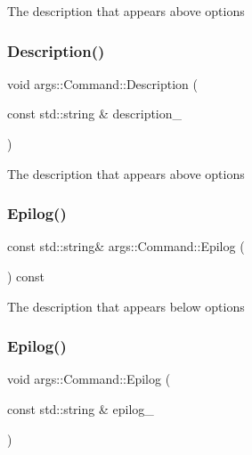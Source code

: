 The description that appears above options \mbox{\label{classargs_1_1_command_a4ee8820d1d6d17b10a01a5cbccce1df8}} 
\subsubsection{\texorpdfstring{Description()}{Description()}\hspace{0.1cm}{\footnotesize\ttfamily [2/2]}}
{\footnotesize\ttfamily void args\+::\+Command\+::\+Description (\begin{DoxyParamCaption}\item[{const std\+::string \&}]{description\+\_\+ }\end{DoxyParamCaption})\hspace{0.3cm}{\ttfamily [inline]}}

The description that appears above options \mbox{\label{classargs_1_1_command_a874b615da38bb03c42a5fdf281ca9e32}} 
\subsubsection{\texorpdfstring{Epilog()}{Epilog()}\hspace{0.1cm}{\footnotesize\ttfamily [1/2]}}
{\footnotesize\ttfamily const std\+::string\& args\+::\+Command\+::\+Epilog (\begin{DoxyParamCaption}{ }\end{DoxyParamCaption}) const\hspace{0.3cm}{\ttfamily [inline]}}

The description that appears below options \mbox{\label{classargs_1_1_command_a7364bfcd513d8f345e1bab5f3371d02d}} 
\subsubsection{\texorpdfstring{Epilog()}{Epilog()}\hspace{0.1cm}{\footnotesize\ttfamily [2/2]}}
{\footnotesize\ttfamily void args\+::\+Command\+::\+Epilog (\begin{DoxyParamCaption}\item[{const std\+::string \&}]{epilog\+\_\+ }\end{DoxyParamCaption})\hspace{0.3cm}{\ttfamily [inline]}}

